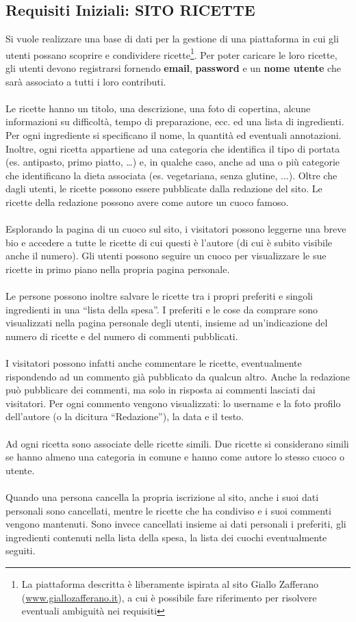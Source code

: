 \documentclass[12pt]{extarticle}
\begin{document}
\subsection{Requisiti Iniziali: SITO RICETTE}
Si vuole realizzare una base di dati per la gestione di una piattaforma in cui gli utenti possano
scoprire e condividere ricette\footnote{La piattaforma descritta è liberamente ispirata al sito Giallo Zafferano 
(\url{www.giallozafferano.it}), a cui è possibile fare riferimento per risolvere eventuali ambiguità nei requisiti}.
Per poter caricare le loro ricette, gli utenti devono registrarsi
fornendo \textbf{email}, \textbf{password} e un \textbf{nome utente} che sarà associato a tutti i loro contributi.
\\\\
Le ricette hanno un titolo, una descrizione, una foto di copertina, alcune informazioni su difficoltà,
tempo di preparazione, ecc. ed una lista di ingredienti. Per ogni ingrediente si
specificano il nome, la quantità ed eventuali annotazioni. Inoltre, ogni ricetta appartiene ad una
categoria che identifica il tipo di portata (es. antipasto, primo piatto, \dots) e, in qualche caso, anche
ad una o più categorie che identificano la dieta associata (es. vegetariana, senza glutine, ...). Oltre
che dagli utenti, le ricette possono essere pubblicate dalla redazione del sito. Le ricette della
redazione possono avere come autore un cuoco famoso.
\\\\
Esplorando la pagina di un cuoco sul sito, i visitatori possono leggerne una
breve bio e accedere a tutte le ricette di cui questi è l’autore (di cui è subito visibile anche il
numero). Gli utenti possono seguire un cuoco per visualizzare le sue ricette in primo piano nella
propria pagina personale.
\\\\
Le persone possono inoltre salvare le ricette tra i propri preferiti e singoli ingredienti in una “lista
della spesa”. I preferiti e le cose da comprare sono visualizzati nella pagina personale degli utenti,
insieme ad un’indicazione del numero di ricette e del numero di commenti pubblicati.
\\\\
I visitatori possono infatti anche commentare le ricette, eventualmente rispondendo ad un
commento già pubblicato da qualcun altro. Anche la redazione può pubblicare dei commenti, ma
solo in risposta ai commenti lasciati dai visitatori. Per ogni commento vengono visualizzati: lo
username e la foto profilo dell’autore (o la dicitura “Redazione”), la data e il testo.
\\\\
Ad ogni ricetta sono associate delle ricette simili. Due ricette si considerano simili se hanno
almeno una categoria in comune e hanno come autore lo stesso cuoco o utente.
\\\\
Quando una persona cancella la propria iscrizione al sito, anche i suoi dati personali sono
cancellati, mentre le ricette che ha condiviso e i suoi commenti vengono mantenuti. Sono invece
cancellati insieme ai dati personali i preferiti, gli ingredienti contenuti nella lista della spesa, la lista
dei cuochi eventualmente seguiti.
\end{document}
